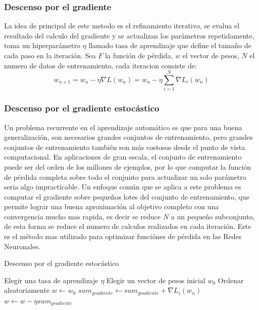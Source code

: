 \documentclass[a4paper,11pt,spanish]{book}
\begin{document}
    \subsubsection{Descenso por el gradiente}
      La idea de principal de este metodo es el refinamiento iterativo, se evalua el resultado del calculo del gradiente y se actualizan los parámetros repetidamente,
      toma un hiperparámetro $\eta$ llamado tasa de aprendizaje que define el tamaño de cada paso en la iteración.
      Sea $F$ la función de pérdida, $w$ el vector de pesos, $N$ el numero de datos de entrenamiento, cada iteracion consiste de:
      \begin{equation}
	w_{n+1} = w_n - \eta \nabla L(w_n)  = w_n - \eta \sum_{i=1}^{N} \nabla L_i(w_n)
      \end{equation}

    \subsubsection{Descenso por el gradiente estocástico}
      Un problema recurrente en el aprendizaje automático es que para una buena generalización, son necesarios grandes conjuntos de entrenamiento,
      pero grandes conjuntos de entrenamiento también son más costosos desde el punto de vista computacional.
      En aplicaciones de gran escala, el conjunto de entrenamiento puede ser del orden de los millones de ejemplos, por lo que computar la función de
      pérdida completa sobre todo el conjunto para actualizar un solo parámetro seria algo impracticable.
      Un enfoque común que se aplica a este problema es computar el gradiente sobre pequeños lotes del conjunto de entrenamiento,
      que permite lograr una buena aproximación al objetivo completo con una convergencia mucho mas rapida, es decir se reduce $N$ a un pequeño subconjunto, de esta forma se reduce el
      numero de calculos realizados en cada iteración.
      Este es el método mas utilizado para optimizar funciónes de pérdida en las Redes Neuronales.

	\begin{algorithm}[h]
	  \caption{Descenso por el gradiente estocástico}
	  \label{SGD}
	  \begin{algorithmic}
	    \State Elegir una tasa de aprendizaje $\eta$
	    \State Elegir un vector de pesos inicial $w_0$
	    \State Ordenar aleatoriamente
	    \State $w \gets w_0$
	    \Repeat
		$sum_{gradiente} \gets sum_{gradiente} + \nabla L_i(w_n)$
	      \EndFor
	      \State $w \gets w - \eta sum_{gradiente}$
	  \end{algorithmic}
	\end{algorithm}
\end{document}
